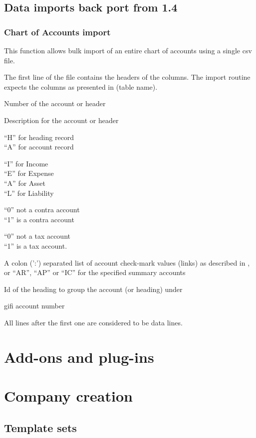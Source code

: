 \section{Data imports back port from 1.4}
\label{sec-customization-import-routines-from-14}

\subsection{Chart of Accounts import}
\label{subsec-customization-import-coa}

This function allows bulk import of an entire chart of accounts using a
single \gls{csv} file.

The first line of the file contains the headers of the columns. The
import routine expects the columns as presented in (table name).

\begin{description}[style=nextline]
\item [accno] Number of the account or header
\item [desc] Description for the account or header
\item [charttype] ``H'' for heading record \\
``A'' for account record
\item [category] ``I'' for Income \\
``E'' for Expense \\
``A'' for Asset \\
``L'' for Liability
\item [contra] ``0'' not a \gls{contra} account \\
``1'' is a \gls{contra} account
\item [tax] ``0'' not a tax account \\
``1'' is a tax account.
\item [link] A colon (':') separated list of account check-mark values (links) as described
    in , or ``AR'', ``AP'' or ``IC'' for the specified summary accounts
\item [heading] Id of the heading to group the account (or heading) under
\item [gifi] \gls{gifi} account number
\end{description}

All lines after the first one are considered to be data lines.

\chapter{Add-ons and plug-ins}
\label{cha-customization-add-ons}

\chapter{Company creation}
\label{cha-customization-company-creation}

\section{Template sets}
\label{sec-customization-company-creation-templates}
